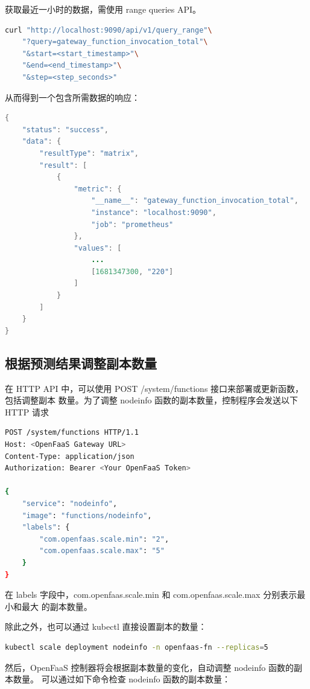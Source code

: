 \documentclass[a4paper,AutoFakeBold,oneside,12pt]{book}
\begin{document}
获取最近一小时的数据，需使用 range queries API。

\begin{lstlisting}[language=bash]
curl "http://localhost:9090/api/v1/query_range"\
	"?query=gateway_function_invocation_total"\
	"&start=<start_timestamp>"\
	"&end=<end_timestamp>"\
	"&step=<step_seconds>"
\end{lstlisting}

从而得到一个包含所需数据的响应：

\begin{lstlisting}[language=Java]
{
    "status": "success",
    "data": {
        "resultType": "matrix",
        "result": [
            {
                "metric": {
                    "__name__": "gateway_function_invocation_total",
                    "instance": "localhost:9090",
                    "job": "prometheus"
                },
                "values": [
                    ...
                    [1681347300, "220"]
                ]
            }
        ]
    }
}
\end{lstlisting}

\subsection{根据预测结果调整副本数量}

在 HTTP API 中，可以使用 POST /system/functions 接口来部署或更新函数，包括调整副本
数量。为了调整 nodeinfo 函数的副本数量，控制程序会发送以下 HTTP 请求

\begin{lstlisting}[language=bash]
	POST /system/functions HTTP/1.1
Host: <OpenFaaS Gateway URL>
Content-Type: application/json
Authorization: Bearer <Your OpenFaaS Token>

{
    "service": "nodeinfo",
    "image": "functions/nodeinfo",
    "labels": {
        "com.openfaas.scale.min": "2",
        "com.openfaas.scale.max": "5"
    }
}

\end{lstlisting}

在 labels 字段中，com.openfaas.scale.min 和 com.openfaas.scale.max 分别表示最小和最大
的副本数量。

除此之外，也可以通过 kubectl 直接设置副本的数量：


\begin{lstlisting}[language=bash]
kubectl scale deployment nodeinfo -n openfaas-fn --replicas=5
\end{lstlisting}

然后，OpenFaaS 控制器将会根据副本数量的变化，自动调整 nodeinfo 函数的副本数量。
可以通过如下命令检查 nodeinfo 函数的副本数量：
\end{document}
